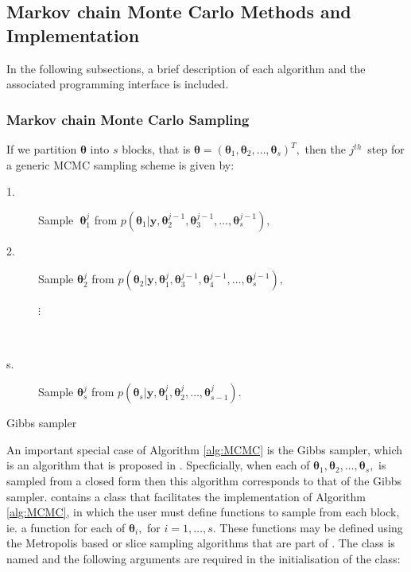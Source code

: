 \documentclass[article]{jss}
\begin{document}
\subsection{Markov chain Monte Carlo Methods and Implementation}

In the following subsections, a brief description of each algorithm
and the associated programming interface is included.


\subsubsection{Markov chain Monte Carlo Sampling}

If we partition $\bm{\theta}$ into $s$ blocks, that is
$\bm{\bm{\theta}}=\left(\bm{\theta}_{1},\bm{\theta}_{2},\ldots,\bm{\theta}_{s}\right)^{T},$
then the $j^{th}$\ step for a generic MCMC sampling scheme is given
by:

%
\begin{algorithm}[H]
\begin{description}
\item [{\textmd{1.}}] Sample\textbf{\ }$\bm{\theta}_{1}^{j}$ from $p\left(\bm{\theta}_{1}|\bm{y,}\bm{\theta}_{2}^{j-1},\bm{\theta}_{3}^{j-1},\ldots,\bm{\theta}_{s}^{j-1}\right),$ 
\item [{\textmd{2.}}] Sample $\bm{\theta}_{2}^{j}$ from $p\left(\bm{\theta}_{2}|\bm{y,}\bm{\theta}_{1}^{j},\bm{\theta}_{3}^{j-1},\bm{\theta}_{4}^{j-1},\ldots,\bm{\theta}_{s}^{j-1}\right),$

\begin{description}
\item [{$\vdots$}]~
\end{description}
\item [{\textmd{s.}}] Sample $\bm{\theta}_{s}^{j}$ from $p\left(\bm{\theta}_{s}|\bm{y,}\bm{\theta}_{1}^{j},\bm{\theta}_{2}^{j},\ldots,\bm{\theta}_{s-1}^{j}\right).$ 
\end{description}
\caption{Gibbs sampler}
\label{alg:MCMC}
\end{algorithm}

An important special case of Algorithm \ref{alg:MCMC} is the Gibbs
sampler, which is an algorithm that is proposed in . Specficially,
when each of $\bm{\theta}_{1},\bm{\theta}_{2},\dots,\bm{\theta}_{s},$
is sampled from a closed form then this algorithm corresponds to that
of the Gibbs sampler.  contains a class that facilitates
the implementation of Algorithm \ref{alg:MCMC}, in which the user must
define functions to sample from each block, ie. a function for each of
$\bm{\theta}_{i},$ for $i=1,\dots,s.$ These functions may be defined
using the Metropolis based or slice sampling algorithms that are part
of . The class is named  and the following
arguments are required in the initialisation of the class:
\end{document}
